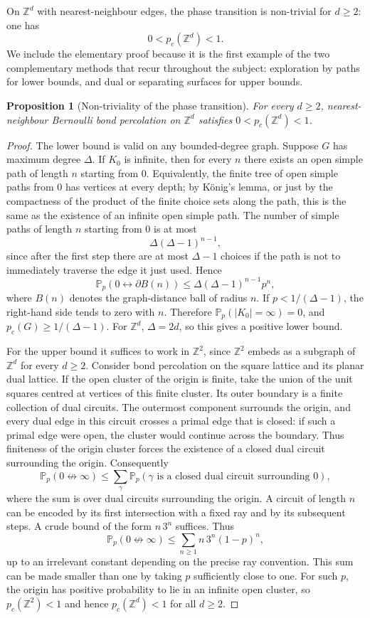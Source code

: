 \documentclass[11pt,reqno]{book}
\numberwithin{equation}{chapter}
\theoremstyle{plain}
\newtheorem{prop}[theorem]{Proposition}
\theoremstyle{definition}
\theoremstyle{remark}
\newcommand{\Pp}{\mathbb P_p}
\newcommand{\Z}{\mathbb Z}
\newcommand{\1}{\mathbf 1}
\begin{document}
On $\Z^d$ with nearest-neighbour edges, the phase transition is non-trivial for $d\geq 2$: one has
\[
  0<p_c(\Z^d)<1.
\]
We include the elementary proof because it is the first example of the two complementary methods that recur throughout the subject: exploration by paths for lower bounds, and dual or separating surfaces for upper bounds.

\begin{prop}[Non-triviality of the phase transition]
For every $d\geq 2$, nearest-neighbour Bernoulli bond percolation on $\Z^d$ satisfies $0<p_c(\Z^d)<1$.
\end{prop}

\begin{proof}
The lower bound is valid on any bounded-degree graph. Suppose $G$ has maximum degree $\Delta$. If $K_0$ is infinite, then for every $n$ there exists an open simple path of length $n$ starting from $0$. Equivalently, the finite tree of open simple paths from $0$ has vertices at every depth; by König's lemma, or just by the compactness of the product of the finite choice sets along the path, this is the same as the existence of an infinite open simple path. The number of simple paths of length $n$ starting from $0$ is at most
\[
  \Delta(\Delta-1)^{n-1},
\]
since after the first step there are at most $\Delta-1$ choices if the path is not to immediately traverse the edge it just used. Hence
\[
  \Pp(0\leftrightarrow \partial B(n))
  \leq
  \Delta(\Delta-1)^{n-1}p^n,
\]
where $B(n)$ denotes the graph-distance ball of radius $n$. If $p<1/(\Delta-1)$, the right-hand side tends to zero with $n$. Therefore $\Pp(|K_0|=\infty)=0$, and $p_c(G)\geq 1/(\Delta-1)$. For $\Z^d$, $\Delta=2d$, so this gives a positive lower bound.

For the upper bound it suffices to work in $\Z^2$, since $\Z^2$ embeds as a subgraph of $\Z^d$ for every $d\geq 2$. Consider bond percolation on the square lattice and its planar dual lattice. If the open cluster of the origin is finite, take the union of the unit squares centred at vertices of this finite cluster. Its outer boundary is a finite collection of dual circuits. The outermost component surrounds the origin, and every dual edge in this circuit crosses a primal edge that is closed: if such a primal edge were open, the cluster would continue across the boundary. Thus finiteness of the origin cluster forces the existence of a closed dual circuit surrounding the origin. Consequently
\[
  \Pp(0\not\leftrightarrow \infty)
  \leq
  \sum_{\gamma}\Pp(\gamma\text{ is a closed dual circuit surrounding }0),
\]
where the sum is over dual circuits surrounding the origin. A circuit of length $n$ can be encoded by its first intersection with a fixed ray and by its subsequent steps. A crude bound of the form $n\,3^n$ suffices. Thus
\[
  \Pp(0\not\leftrightarrow \infty)
  \leq
  \sum_{n\geq 1} n\,3^n(1-p)^n,
\]
up to an irrelevant constant depending on the precise ray convention. This sum can be made smaller than one by taking $p$ sufficiently close to one. For such $p$, the origin has positive probability to lie in an infinite open cluster, so $p_c(\Z^2)<1$ and hence $p_c(\Z^d)<1$ for all $d\geq 2$.
\end{proof}
\end{document}
